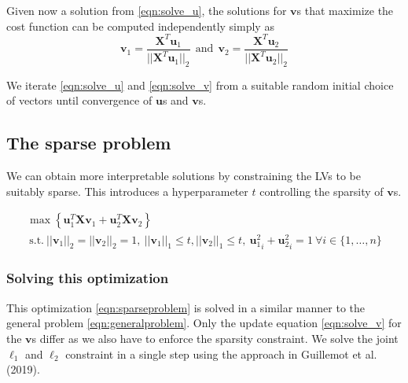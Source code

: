 \documentclass[10pt,a4paper]{article}
\begin{document}
Given now a solution from \eqref{eqn:solve_u}, the solutions for $\textbf{v}$s that maximize the cost function can be computed independently simply as
\begin{equation}
 \textbf{v}_1 = \frac{\textbf{X}^T\textbf{u}_1}{||\textbf{X}^T\textbf{u}_1||_2} ~~\textrm{and}~~ \textbf{v}_2 = \frac{\textbf{X}^T\textbf{u}_2}{||\textbf{X}^T\textbf{u}_2||_2}
 \label{eqn:solve_v}
 \end{equation} 
 
 We iterate \eqref{eqn:solve_u} and \eqref{eqn:solve_v} from a suitable random initial choice of vectors until convergence of $\textbf{u}$s and $\textbf{v}$s.
 
\subsection*{The sparse problem}
We can obtain more interpretable solutions by constraining the LVs to be suitably sparse. This introduces a hyperparameter $t$ controlling the sparsity of $\textbf{v}$s.

\begin{multline}
\max \left\{ \textbf{u}_1^T \textbf{X} \textbf{v}_1 + \textbf{u}_2^T \textbf{X} \textbf{v}_2\right\} \\~\textrm{s.t.}~ ||\textbf{v}_1||_2 = ||\textbf{v}_2||_2=1,~||\textbf{v}_1||_1\leq t, ||\textbf{v}_2||_1\leq t,~ {\textbf{u}_1^2}_i + {\textbf{u}_2^2}_i = 1~ \forall i\in \{1,\ldots,n\}
\label{eqn:sparseproblem}
\end{multline}

\subsubsection*{Solving this optimization}
This optimization \eqref{eqn:sparseproblem} is solved in a similar manner to the general problem \eqref{eqn:generalproblem}. Only the update equation \eqref{eqn:solve_v} for the $\textbf{v}$s differ as we also have to enforce the sparsity constraint. We solve the joint $\ell_1$ and $\ell_2$ constraint in a single step using the approach in Guillemot et al. (2019).
\end{document}
